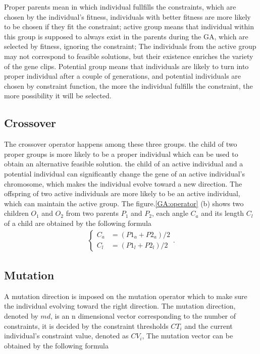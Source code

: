 Proper parents mean in which individual fullfills the constraints, which are
chosen by the individual's fitness, individuals with better fitness are more
likely to be chosen if they fit the constraint; active group means that
individual within this group is supposed to always exist in the parents during the GA, which
are selected by fitness, ignoring the constraint; The individuals from the active
group may not correspond to feasible solutions, but their existence enriches the
variety of the gene clips.  Potential group means that individuals are likely to turn
into proper individual after a couple of generations, and potential individuals
are chosen by constraint function, the more the individual fulfills the
constraint, the more possibility it will be selected.

\subsection{Crossover}
The crossover operator happens among these three groups. the child of two proper
groups is more likely to be a proper individual which can be used to obtain an
alternative feasible solution. the child of an active individual and a potential
individual can significantly change the gene of an active individual's chromosome,
which makes the individual evolve toward a new direction. The offspring of two
active individuals are more likely to be an active individual, which can maintain
the active group.  The figure.\ref{GA:operator} (b) shows two children $O_1$
and $O_2$ from two parents $P_1$ and $P_2$, each angle $C_a$ and its length 
$C_l$ of a child are obtained by the following formula
\begin{align} 
	\begin{cases}
	C_a &= (P1_a + P2_a)/2 \\
	C_l &= (P1_l + P2_l)/2 
\end{cases} \textstyle{.}
\end{align}

\subsection{Mutation}
A mutation direction is imposed on the mutation operator which to make sure the
individual evolving toward the right direction. The mutation direction, denoted
by $md$, is an n dimensional vector corresponding to the number of constraints, it
is decided by the constraint thresholds $CT_i$ and the current individual's
constraint value, denoted as $CV_i$,  The mutation vector can be obtained by the
following formula

